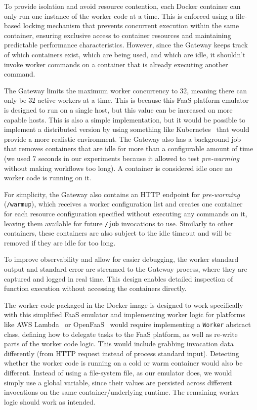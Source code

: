 To provide isolation and avoid resource contention, each Docker container can only run one instance of the worker code at a time. This is enforced using a file-based locking mechanism that prevents concurrent execution within the same container, ensuring exclusive access to container resources and maintaining predictable performance characteristics. However, since the Gateway keeps track of which containers exist, which are being used, and which are idle, it shouldn't invoke worker commands on a container that is already executing another command.

The Gateway limits the maximum worker concurrency to 32, meaning there can only be 32 active workers at a time. This is because this FaaS platform emulator is designed to run on a single host, but this value can be increased on more capable hosts. This is also a simple implementation, but it would be possible to implement a distributed version by using something like Kubernetes~\cite{kubernetes} that would provide a more realistic environment. The Gateway also has a background job that removes containers that are idle for more than a configurable amount of time (we used 7 seconds in our experiments because it allowed to test \textit{pre-warming} without making workflows too long). A container is considered idle once no worker code is running on it.

For simplicity, the Gateway also contains an HTTP endpoint for \textit{pre-warming} (\texttt{/warmup}), which receives a worker configuration list and creates one container for each resource configuration specified without executing any commands on it, leaving them available for future \texttt{/job} invocations to use. Similarly to other containers, these containers are also subject to the idle timeout and will be removed if they are idle for too long.

To improve observability and allow for easier debugging, the worker standard output and standard error are streamed to the Gateway process, where they are captured and logged in real time. This design enables detailed inspection of function execution without accessing the containers directly.

The worker code packaged in the Docker image is designed to work specifically with this simplified FaaS emulator and implementing worker logic for platforms like AWS Lambda~\cite{aws_lambda} or OpenFaaS~\cite{openfaas} would require implementing a \texttt{Worker} abstract class, defining how to delegate tasks to the FaaS platform, as well as re-write parts of the worker code logic. This would include grabbing invocation data differently (from HTTP request instead of process standard input). Detecting whether the worker code is running on a cold or warm container would also be different. Instead of using a file-system file, as our emulator does, we would simply use a global variable, since their values are persisted across different invocations on the same container/underlying runtime. The remaining worker logic should work as intended.

